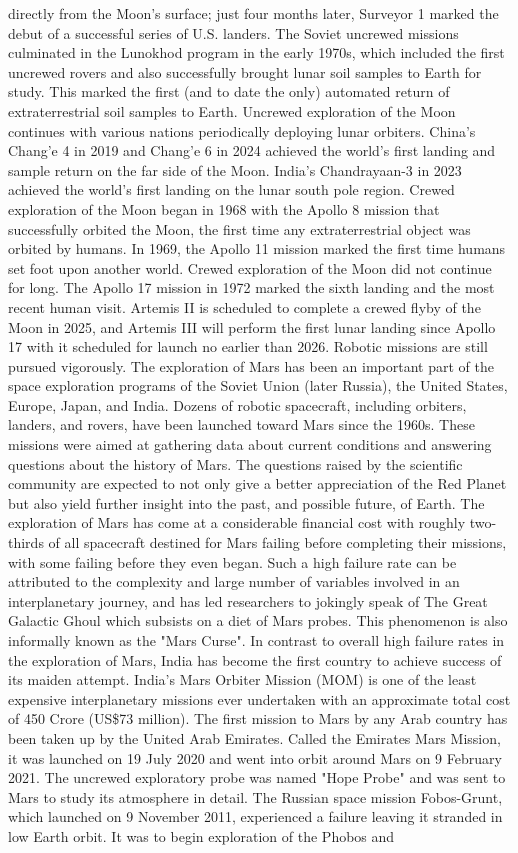 \documentclass[12pt]{article}
\begin{document}
directly from the Moon's surface; just four months later, Surveyor 1 marked the debut of a successful series of U.S. landers. The Soviet uncrewed missions culminated in the Lunokhod program in the early 1970s, which included the first uncrewed rovers and also successfully brought lunar soil samples to Earth for study. This marked the first (and to date the only) automated return of extraterrestrial soil samples to Earth. Uncrewed exploration of the Moon continues with various nations periodically deploying lunar orbiters. China's Chang'e 4 in 2019 and Chang'e 6 in 2024 achieved the world's first landing and sample return on the far side of the Moon. India's Chandrayaan-3 in 2023 achieved the world's first landing on the lunar south pole region. Crewed exploration of the Moon began in 1968 with the Apollo 8 mission that successfully orbited the Moon, the first time any extraterrestrial object was orbited by humans. In 1969, the Apollo 11 mission marked the first time humans set foot upon another world. Crewed exploration of the Moon did not continue for long. The Apollo 17 mission in 1972 marked the sixth landing and the most recent human visit. Artemis II is scheduled to complete a crewed flyby of the Moon in 2025, and Artemis III will perform the first lunar landing since Apollo 17 with it scheduled for launch no earlier than 2026. Robotic missions are still pursued vigorously. The exploration of Mars has been an important part of the space exploration programs of the Soviet Union (later Russia), the United States, Europe, Japan, and India. Dozens of robotic spacecraft, including orbiters, landers, and rovers, have been launched toward Mars since the 1960s. These missions were aimed at gathering data about current conditions and answering questions about the history of Mars. The questions raised by the scientific community are expected to not only give a better appreciation of the Red Planet but also yield further insight into the past, and possible future, of Earth. The exploration of Mars has come at a considerable financial cost with roughly two-thirds of all spacecraft destined for Mars failing before completing their missions, with some failing before they even began. Such a high failure rate can be attributed to the complexity and large number of variables involved in an interplanetary journey, and has led researchers to jokingly speak of The Great Galactic Ghoul which subsists on a diet of Mars probes. This phenomenon is also informally known as the "Mars Curse". In contrast to overall high failure rates in the exploration of Mars, India has become the first country to achieve success of its maiden attempt. India's Mars Orbiter Mission (MOM) is one of the least expensive interplanetary missions ever undertaken with an approximate total cost of 450 Crore (US\$73 million). The first mission to Mars by any Arab country has been taken up by the United Arab Emirates. Called the Emirates Mars Mission, it was launched on 19 July 2020 and went into orbit around Mars on 9 February 2021. The uncrewed exploratory probe was named "Hope Probe" and was sent to Mars to study its atmosphere in detail. The Russian space mission Fobos-Grunt, which launched on 9 November 2011, experienced a failure leaving it stranded in low Earth orbit. It was to begin exploration of the Phobos and 
\end{document}
